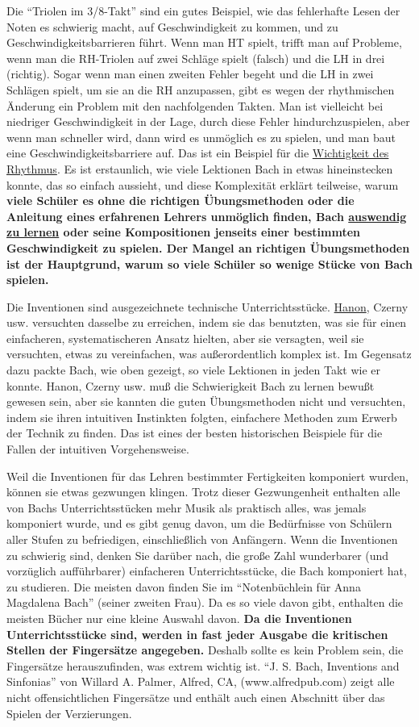 Die \enquote{Triolen im 3/8-Takt} sind ein gutes Beispiel, wie das fehlerhafte Lesen der Noten es schwierig macht, auf Geschwindigkeit zu kommen, und zu Geschwindigkeitsbarrieren führt.
Wenn man HT spielt, trifft man auf Probleme, wenn man die RH-Triolen auf zwei Schläge spielt (falsch) und die LH in drei (richtig).
Sogar wenn man einen zweiten Fehler begeht und die LH in zwei Schlägen spielt, um sie an die RH anzupassen, gibt es wegen der rhythmischen Änderung ein Problem mit den nachfolgenden Takten.
Man ist vielleicht bei niedriger Geschwindigkeit in der Lage, durch diese Fehler hindurchzuspielen, aber wenn man schneller wird, dann wird es unmöglich es zu spielen, und man baut eine Geschwindigkeitsbarriere auf.
Das ist ein Beispiel für die \hyperlink{c1iii1b}{Wichtigkeit des Rhythmus}.
Es ist erstaunlich, wie viele Lektionen Bach in etwas hineinstecken konnte, das so einfach aussieht, und diese Komplexität erklärt teilweise, warum \textbf{viele Schüler es ohne die richtigen Übungsmethoden oder die Anleitung eines erfahrenen Lehrers unmöglich finden, Bach \hyperlink{c1iii6}{auswendig zu lernen} oder seine Kompositionen jenseits einer bestimmten Geschwindigkeit zu spielen.
Der Mangel an richtigen Übungsmethoden ist der Hauptgrund, warum so viele Schüler so wenige Stücke von Bach spielen.}

Die Inventionen sind ausgezeichnete technische Unterrichtsstücke.
\hyperlink{c1iii7h}{Hanon}, Czerny usw. versuchten dasselbe zu erreichen, indem sie das benutzten, was sie für einen einfacheren, systematischeren Ansatz hielten, aber sie versagten, weil sie versuchten, etwas zu vereinfachen, was außerordentlich komplex ist.
Im Gegensatz dazu packte Bach, wie oben gezeigt, so viele Lektionen in jeden Takt wie er konnte.
Hanon, Czerny usw. muß die Schwierigkeit Bach zu lernen bewußt gewesen sein, aber sie kannten die guten Übungsmethoden nicht und versuchten, indem sie ihren intuitiven Instinkten folgten, einfachere Methoden zum Erwerb der Technik zu finden.
Das ist eines der besten historischen Beispiele für die Fallen der intuitiven Vorgehensweise.

Weil die Inventionen für das Lehren bestimmter Fertigkeiten komponiert wurden, können sie etwas gezwungen klingen. 
Trotz dieser Gezwungenheit enthalten alle von Bachs Unterrichtsstücken mehr Musik als praktisch alles, was jemals komponiert wurde, und es gibt genug davon, um die Bedürfnisse von Schülern aller Stufen zu befriedigen, einschließlich von Anfängern.
Wenn die Inventionen zu schwierig sind, denken Sie darüber nach, die große Zahl wunderbarer (und vorzüglich aufführbarer) einfacheren Unterrichtsstücke, die Bach komponiert hat, zu studieren.
Die meisten davon finden Sie im \enquote{Notenbüchlein für Anna Magdalena Bach} (seiner zweiten Frau).
Da es so viele davon gibt, enthalten die meisten Bücher nur eine kleine Auswahl davon.
\textbf{Da die Inventionen Unterrichtsstücke sind, werden in fast jeder Ausgabe die kritischen Stellen der Fingersätze angegeben.}
Deshalb sollte es kein Problem sein, die Fingersätze herauszufinden, was extrem wichtig ist.
\enquote{J. S. Bach, Inventions and Sinfonias} von Willard A. Palmer, Alfred, CA, (www.alfredpub.com) zeigt alle nicht offensichtlichen Fingersätze und enthält auch einen Abschnitt über das Spielen der Verzierungen.

